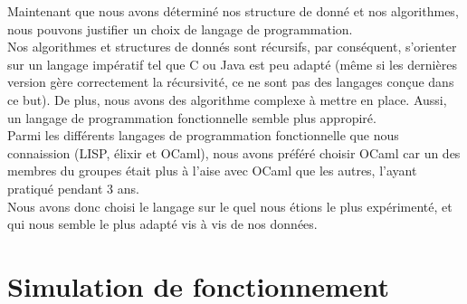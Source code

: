 \documentclass[a4paper,12pt]{report}
\begin{document}
Maintenant que nous avons d\'etermin\'e nos structure de donn\'e et nos algorithmes, nous pouvons justifier un choix de langage de programmation. \\
Nos algorithmes et structures de donn\'es sont r\'ecursifs, par cons\'equent, s'orienter sur un langage imp\'eratif tel que C ou Java est peu adapt\'e (m\^eme si les derni\`eres version g\`ere correctement la r\'ecursivit\'e, ce ne sont pas des langages con\c{c}ue dans ce but). De plus, nous avons des algorithme complexe \`a mettre en place. Aussi, un langage de programmation fonctionnelle semble plus appropir\'e. \\
Parmi les diff\'erents langages de programmation fonctionnelle que nous connaission (LISP, \'elixir et OCaml), nous avons pr\'ef\'er\'e choisir OCaml car un des membres du groupes \'etait plus \`a l'aise avec OCaml que les autres, l'ayant pratiqu\'e pendant 3 ans. \\
Nous avons donc choisi le langage sur le quel nous \'etions le plus exp\'eriment\'e, et qui nous semble le plus adapt\'e vis \`a vis de nos donn\'ees.

\part{Simulation de fonctionnement}
\end{document}
